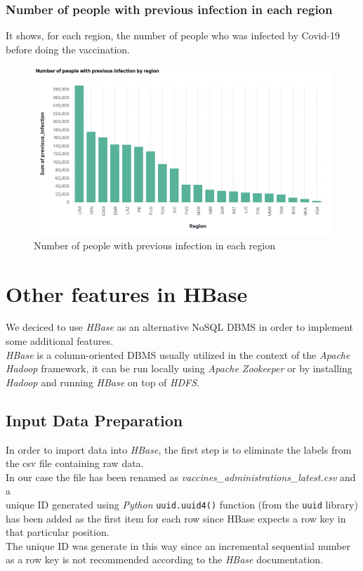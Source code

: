 \documentclass[12pt, a4paper]{article}
\begin{document}
\subsubsection{Number of people with previous infection in each region}
It shows, for each region, the number of people who was infected by Covid-19 before doing the vaccination.
\begin{figure}[ht]
  \centering
  \includegraphics[width=.8\linewidth]{img (16).png}
\caption*{Number of people with previous infection in each region}
\end{figure}


\clearpage

\section{Other features in HBase} 

We deciced to use \emph{HBase} as an alternative NoSQL DBMS in order to implement some 
additional features. \\
\emph{HBase} is a column-oriented DBMS usually utilized in the context of the 
\emph{Apache Hadoop} framework, it can be run locally using \emph{Apache Zookeeper} or 
by installing \emph{Hadoop} and running \emph{HBase} on top of \emph{HDFS}.

\subsection{Input Data Preparation}

In order to import data into \emph{HBase}, the first step is to eliminate the labels 
from the csv file containing raw data. \\
In our case the file has been renamed as \emph{vaccines\_administrations\_latest.csv} 
and a \\ unique ID generated using \emph{Python} \texttt{uuid.uuid4()} function 
(from the \texttt{uuid} library) has been added as the first item for each row since
HBase expects a row key in that particular position. \\ 
The unique ID was generate in this way since an incremental sequential number as a 
row key is not recommended according to the \emph{HBase} documentation. 
\end{document}
